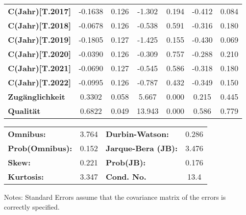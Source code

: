 \begin{center}
\begin{tabular}{lcccccc}
\textbf{C(Jahr)[T.2017]} &      -0.1638  &        0.126     &    -1.302  &         0.194        &       -0.412    &        0.084     \\
\textbf{C(Jahr)[T.2018]} &      -0.0678  &        0.126     &    -0.538  &         0.591        &       -0.316    &        0.180     \\
\textbf{C(Jahr)[T.2019]} &      -0.1805  &        0.127     &    -1.425  &         0.155        &       -0.430    &        0.069     \\
\textbf{C(Jahr)[T.2020]} &      -0.0390  &        0.126     &    -0.309  &         0.757        &       -0.288    &        0.210     \\
\textbf{C(Jahr)[T.2021]} &      -0.0690  &        0.127     &    -0.545  &         0.586        &       -0.318    &        0.180     \\
\textbf{C(Jahr)[T.2022]} &      -0.0995  &        0.126     &    -0.787  &         0.432        &       -0.349    &        0.150     \\
\textbf{Zugänglichkeit}  &       0.3302  &        0.058     &     5.667  &         0.000        &        0.215    &        0.445     \\
\textbf{Qualität}        &       0.6822  &        0.049     &    13.943  &         0.000        &        0.586    &        0.779     \\
\bottomrule
\end{tabular}
\begin{tabular}{lclc}
\textbf{Omnibus:}       &  3.764 & \textbf{  Durbin-Watson:     } &    0.286  \\
\textbf{Prob(Omnibus):} &  0.152 & \textbf{  Jarque-Bera (JB):  } &    3.476  \\
\textbf{Skew:}          &  0.221 & \textbf{  Prob(JB):          } &    0.176  \\
\textbf{Kurtosis:}      &  3.347 & \textbf{  Cond. No.          } &     13.4  \\
\bottomrule
\end{tabular}
\end{center}

Notes: \newline
 [1] Standard Errors assume that the covariance matrix of the errors is correctly specified.